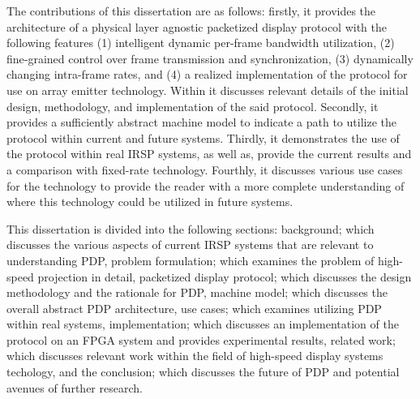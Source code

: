 The contributions of this dissertation are as follows: firstly, it provides the architecture of a physical layer agnostic packetized display protocol with the following features (1) intelligent dynamic per-frame bandwidth utilization, (2) fine-grained control over frame transmission and synchronization, (3) dynamically changing intra-frame rates, and (4) a realized implementation of the protocol for use on array emitter technology. Within it discusses relevant details of the initial design, methodology, and implementation of the said protocol. Secondly, it provides a sufficiently abstract machine model to indicate a path to utilize the protocol within current and future systems. Thirdly, it demonstrates the use of the protocol within real IRSP systems, as well as, provide the current results and a comparison with fixed-rate technology. Fourthly, it discusses various use cases for the technology to provide the reader with a more complete understanding of where this technology could be utilized in future systems.

This dissertation is divided into the following sections: background; which discusses the various aspects of current IRSP systems that are relevant to understanding PDP, problem formulation; which examines the problem of high-speed projection in detail, packetized display protocol; which discusses the design methodology and the rationale for PDP, machine model; which discusses the overall abstract PDP architecture, use cases; which examines utilizing PDP within real systems, implementation; which discusses an implementation of the protocol on an FPGA system and provides experimental results, related work; which discusses relevant work within the field of high-speed display systems techology, and the conclusion; which discusses the future of PDP and potential avenues of further research.
